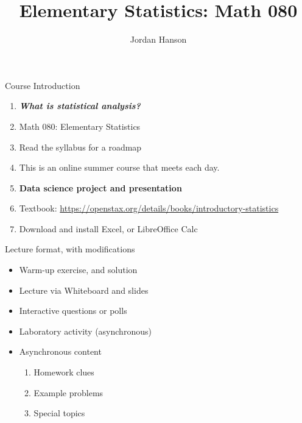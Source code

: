 \documentclass{beamer}
\title{Elementary Statistics: Math 080}
\author{Jordan Hanson}
\institute{Whittier College Department of Physics and Astronomy}
\begin{document}
\maketitle

\begin{frame}{Course Introduction}
\begin{enumerate}
\item \textit{\textbf{\alert{What is statistical analysis?}}}
\item Math 080: Elementary Statistics
\item Read the syllabus for a roadmap
\item This is an online summer course that meets each day.
\item \textbf{Data science project and presentation}
\item Textbook: \url{https://openstax.org/details/books/introductory-statistics}
\item Download and install Excel, or LibreOffice Calc
\end{enumerate}
\end{frame}

\begin{frame}{Lecture format, with modifications}
\begin{itemize}
\item Warm-up exercise, and solution
\item Lecture via Whiteboard and slides
\item Interactive questions or polls
\item Laboratory activity (asynchronous)
\item Asynchronous content
\begin{enumerate}
\item Homework clues
\item Example problems
\item Special topics
\end{enumerate}
\end{itemize}
\end{frame}
\end{document}
